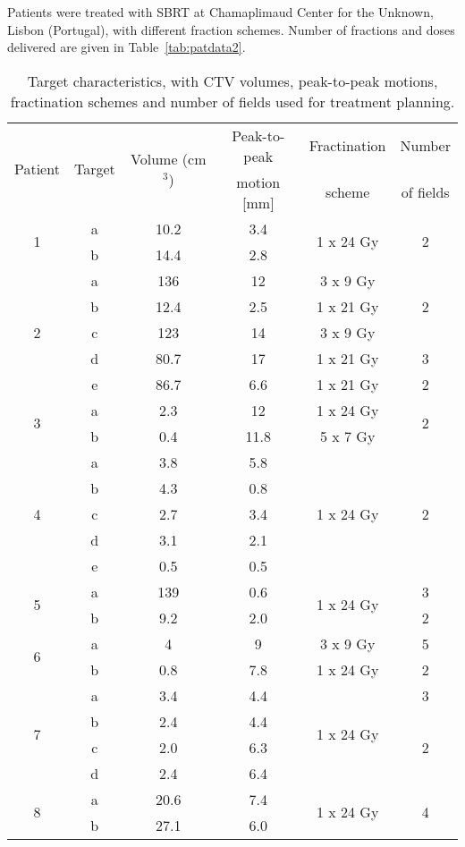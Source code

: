 \documentclass[type=dr, dr=rernat, accentcolor=tud7b,colorbacktitle, bigchapter, openright, twoside, 12pt ]{tudthesis}
\begin{document}
Patients were treated with SBRT at Chamaplimaud Center for the Unknown, Lisbon (Portugal), with different fraction schemes. Number of fractions and doses delivered are given in Table~\ref{tab:patdata2}. 

\begin{table}[H]
	\centering
	\caption{Target characteristics, with CTV volumes, peak-to-peak motions, fractination schemes and number of fields used for treatment planning.}
	\begin{tabular}{c|c|c|c|c|c}
		\hline\hline
		\multirow{2}{*}{Patient} & \multirow{2}{*}{Target} & \multirow{2}{*}{Volume (cm$^3$)} & Peak-to-peak & Fractination & Number \\
		 & & & motion [mm] & scheme & of fields \\
		\hline
		\multirow{2}{*}{1} & a & 10.2 & 3.4  & \multirow{2}{*}{1 x 24 Gy} & \multirow{2}{*}{2} \\
		 & b & 14.4 & 2.8 &  &  \\
		 
		 \hline
		 \multirow{5}{*}{2} & a & 136 & 12  & 3 x 9 Gy & \multirow{3}{*}{2} \\
		  & b & 12.4 & 2.5  & 1 x 21 Gy &  \\
		  & c & 123 & 14  & 3 x 9 Gy &  \\
		 & d & 80.7 & 17  & 1 x 21 Gy & 3 \\
		 & e & 86.7 & 6.6  & 1 x 21 Gy & 2 \\
		 \hline
		 \multirow{2}{*}{3} & a & 2.3 & 12  & 1 x 24 Gy & \multirow{2}{*}{2} \\
		 & b & 0.4 & 11.8  & 5 x 7 Gy &  \\
		 \hline
		 \multirow{5}{*}{4} & a & 3.8 & 5.8  & \multirow{5}{*}{1 x 24 Gy} & \multirow{5}{*}{2} \\
		  & b & 4.3 & 0.8  &  & \\
		  & c & 2.7 & 3.4  &  & \\
		  & d & 3.1 & 2.1  &  & \\
		  & e & 0.5 & 0.5  &  & \\
		  \hline
		  \multirow{2}{*}{5} & a & 139 & 0.6 & \multirow{2}{*}{1 x 24 Gy} & 3 \\
		 & b & 9.2 & 2.0  &  & 2 \\
		 \hline
		 \multirow{2}{*}{6} & a & 4 & 9  & 3 x 9 Gy  & 5 \\
		 & b & 0.8 & 7.8  & 1 x 24 Gy & 2 \\
		 \hline
		 \multirow{4}{*}{7} & a & 3.4   & 4.4    & \multirow{4}{*}{1 x 24 Gy} & 3  \\
				    & b & 2.4 & 4.4  & & \multirow{3}{*}{2} \\
				    & c & 2.0 & 6.3  & & \\
				    & d & 2.4 & 6.4  & & \\
		\hline	    
		\multirow{2}{*}{8} & a & 20.6 & 7.4 & \multirow{2}{*}{1 x 24 Gy} & \multirow{2}{*}{4}  \\
		 & b & 27.1 & 6.0  &  &   \\
		 

\end{tabular}
\end{table}
\end{document}
